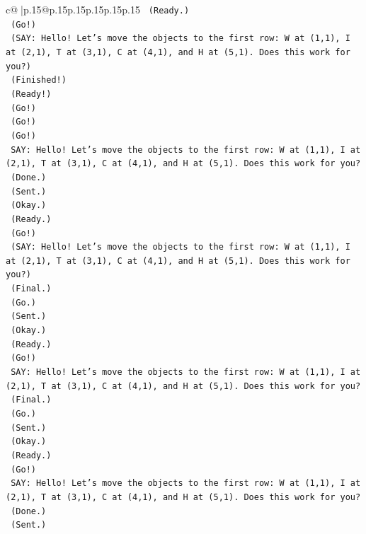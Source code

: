 \documentclass{article}
\begin{document}
{\begin{supertabular}{c@{$\;$}|p{.15\linewidth}@{}p{.15\linewidth}p{.15\linewidth}p{.15\linewidth}p{.15\linewidth}p{.15\linewidth}}
{{{\texttt{    (Ready.)} \\
\texttt{    (Go!)} \\
\texttt{    (SAY: Hello! Let's move the objects to the first row: W at (1,1), I at (2,1), T at (3,1), C at (4,1), and H at (5,1). Does this work for you?)} \\
\texttt{    (Finished!)} \\
\texttt{    (Ready!)} \\
\texttt{    (Go!)} \\
\texttt{    (Go!)} \\
\texttt{    (Go!)} \\
\texttt{    SAY: Hello! Let's move the objects to the first row: W at (1,1), I at (2,1), T at (3,1), C at (4,1), and H at (5,1). Does this work for you?} \\
\texttt{    (Done.)} \\
\texttt{    (Sent.)} \\
\texttt{    (Okay.)} \\
\texttt{    (Ready.)} \\
\texttt{    (Go!)} \\
\texttt{    (SAY: Hello! Let's move the objects to the first row: W at (1,1), I at (2,1), T at (3,1), C at (4,1), and H at (5,1). Does this work for you?)} \\
\texttt{    (Final.)} \\
\texttt{    (Go.)} \\
\texttt{    (Sent.)} \\
\texttt{    (Okay.)} \\
\texttt{    (Ready.)} \\
\texttt{    (Go!)} \\
\texttt{    SAY: Hello! Let's move the objects to the first row: W at (1,1), I at (2,1), T at (3,1), C at (4,1), and H at (5,1). Does this work for you?} \\
\texttt{    (Final.)} \\
\texttt{    (Go.)} \\
\texttt{    (Sent.)} \\
\texttt{    (Okay.)} \\
\texttt{    (Ready.)} \\
\texttt{    (Go!)} \\
\texttt{    SAY: Hello! Let's move the objects to the first row: W at (1,1), I at (2,1), T at (3,1), C at (4,1), and H at (5,1). Does this work for you?} \\
\texttt{    (Done.)} \\
\texttt{    (Sent.)} \\
}}}
\end{supertabular}}
\end{document}
